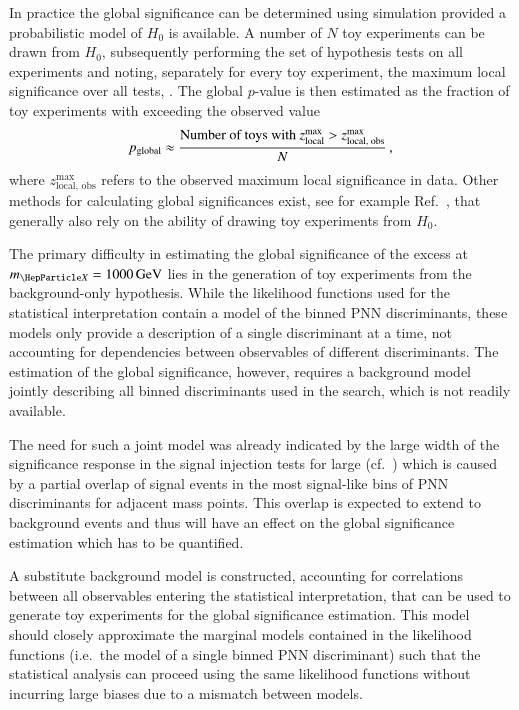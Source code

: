 In practice the global significance can be determined using simulation
provided a probabilistic model of $H_0$ is available. A number of $N$
toy experiments can be drawn from $H_0$, subsequently performing the
set of hypothesis tests on all experiments and noting, separately for
every toy experiment, the maximum local significance over all tests,
\zmaxlocal. The global $p$-value is then estimated as the fraction of
toy experiments with \zmaxlocal exceeding the observed value
\begin{align*}
  p_{\text{global}} \approx \frac{ \text{Number of toys with } z_{\text{local}}^{\text{max}} > z_{\text{local, obs}}^{\text{max}} }
                        { N } \,\text{,}
\end{align*}
where $z_{\text{local, obs}}^{\text{max}}$ refers to the observed
maximum local significance in data. Other methods for calculating
global significances exist, see for example Ref.~\cite{Gross:2010qma},
that generally also rely on the ability of drawing toy experiments
from $H_0$.

The primary difficulty in estimating the global significance of the
excess at $\mX = \SI{1000}{\GeV}$ lies in the generation of toy
experiments from the background-only hypothesis. While the likelihood
functions used for the statistical interpretation contain a model of
the binned PNN discriminants, these models only provide a description
of a single discriminant at a time, not accounting for dependencies
between observables of different discriminants. The estimation of the
global significance, however, requires a background model jointly
describing all binned discriminants used in the search, which is not
readily available.

The need for such a joint model was already indicated by the large
width of the significance response in the signal injection tests for
large \mX (cf.~) which is caused by a
partial overlap of signal events in the most signal-like bins of PNN
discriminants for adjacent mass points. This overlap is expected to
extend to background events and thus will have an effect on the global
significance estimation which has to be quantified.

A substitute background model is constructed, accounting for
correlations between all observables entering the statistical
interpretation, that can be used to generate toy experiments for the
global significance estimation. This model should closely approximate
the marginal models contained in the likelihood functions (i.e.\ the
model of a single binned PNN discriminant) such that the statistical
analysis can proceed using the same likelihood functions without
incurring large biases due to a mismatch between models.

